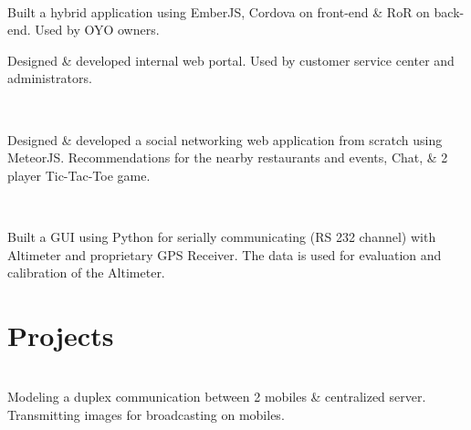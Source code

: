 \documentclass[]{deedy-resume-openfont}
\begin{document}
\hfill
{}\\
\begin{tightemize}
\item {} Built a hybrid application using EmberJS, Cordova on front-end \& RoR on back-end. Used by OYO owners.
\item {} Designed \& developed internal web portal. Used by customer service center and administrators.
\end{tightemize}

\hfill
{}\\
\begin{tightemize}
\item Designed \& developed a social networking web application from scratch using MeteorJS. Recommendations for the nearby restaurants and events, Chat, \& 2 player Tic-Tac-Toe game.
\end{tightemize}

\hfill
{}\\
\begin{tightemize}
\item Built a GUI using Python for serially communicating (RS 232 channel) with Altimeter and proprietary GPS Receiver. The data is used for evaluation and calibration of the Altimeter.
\end{tightemize}


\section{Projects}
\hfill
{}\\
Modeling a duplex communication between 2 mobiles \& centralized server. Transmitting images for broadcasting on mobiles.
\end{document}
